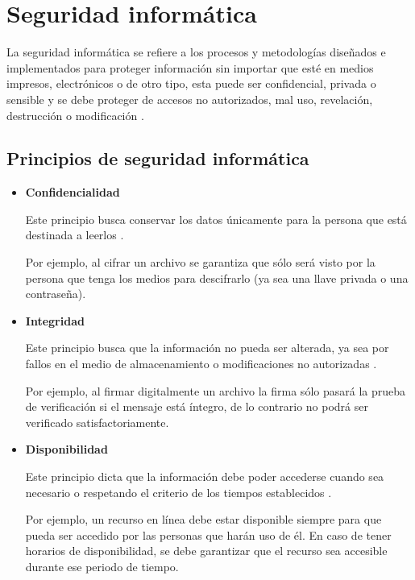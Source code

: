 \section {Seguridad inform\'{a}tica}

La seguridad inform\'{a}tica se refiere a los procesos y metodolog\'{i}as dise\~{n}ados e implementados para proteger informaci\'{o}n sin importar que est\'{e} en medios impresos, electr\'{o}nicos o de otro tipo, esta puede ser confidencial, privada o sensible y se debe proteger de accesos no autorizados, mal uso, revelaci\'{o}n, destrucci\'{o}n o modificaci\'{o}n \cite{_sans:_????}.

  \subsection {Principios de seguridad inform\'{a}tica}

\begin{itemize}

  \item \textbf{Confidencialidad}

Este principio busca conservar los datos \'{u}nicamente para la persona que est\'{a} destinada a leerlos \cite{_nist_????}\cite{_information_????}.

Por ejemplo, al cifrar un archivo se garantiza que s\'{o}lo ser\'{a} visto por la persona que tenga los medios para descifrarlo (ya sea una llave privada o una contrase\~{n}a).

  \item \textbf{Integridad}

Este principio busca que la informaci\'{o}n no pueda ser alterada, ya sea por fallos en el medio de almacenamiento o modificaciones no autorizadas \cite{_nist_????}\cite{_information_????}.

Por ejemplo, al firmar digitalmente un archivo la firma s\'{o}lo pasar\'{a} la prueba de verificaci\'{o}n si el mensaje est\'{a} \'{i}ntegro, de lo contrario no podr\'{a} ser verificado satisfactoriamente.

\newpage
  \item \textbf{Disponibilidad}

Este principio dicta que la informaci\'{o}n debe poder accederse cuando sea necesario o respetando el criterio de los tiempos establecidos \cite{_nist_????}\cite{_information_????}.

Por ejemplo, un recurso en l\'{i}nea debe estar disponible siempre para que pueda ser accedido por las personas que har\'{a}n uso de \'{e}l. En caso de tener horarios de disponibilidad, se debe garantizar que el recurso sea accesible durante ese periodo de tiempo.

\end{itemize}

